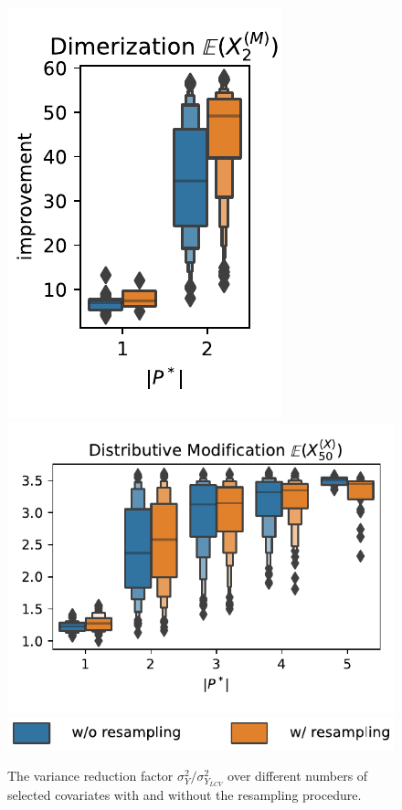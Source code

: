\begin{figure}[htb]
    \centering
    \includegraphics[scale=.65]{gfx/dim_improvement_numcv.pdf}
    \includegraphics[scale=.65]{gfx/dm_improvement_numcv.pdf}
    \includegraphics[scale=.65]{gfx/improvement_numcv_legend.pdf}
    \caption[Number of \ac{CV} v.\ variance reduction]{\label{fig:cv:refinement}The variance reduction factor $\sigma_{Y}^2 / \sigma_{Y_{LCV}}^2$ over different numbers of selected covariates with and without the resampling procedure.}
\end{figure}

